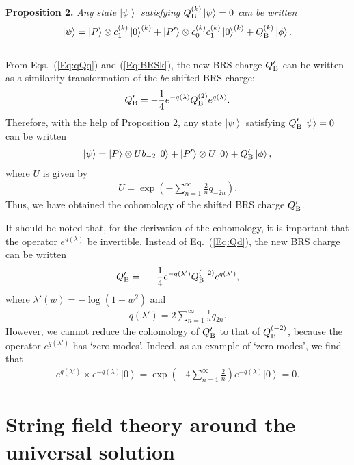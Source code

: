 \documentclass[a4paper,seceq,preprint]{ptptex}
\newcommand{\ket}[1]{\left| #1 \right>}
\newcommand{\Q}{Q_{\rm B}}
\begin{document}
\noindent
{\bf Proposition 2.}
{\it
Any state $\ket{\psi}$ satisfying $\Q^{(k)}\ket{\psi}=0$ 
can be written 
\begin{eqnarray}
 \ket{\psi} = \ket{P}\otimes c_1^{(k)}\ket{0}^{(k)}
              +\ket{P'}\otimes c_0^{(k)}c_1^{(k)}\ket{0}^{(k)}
              +\Q^{(k)}\ket{\phi}.
\end{eqnarray}
}
\\

From Eqs.~(\ref{Eq:qQq}) and (\ref{Eq:BRSk}), the new BRS charge $\Q'$
can be written as a similarity transformation of the $bc$-shifted BRS charge:
\begin{eqnarray}
\label{Eq:Qd}
 \Q' = -\frac{1}{4} e^{-q(\lambda)} \Q^{(2)} e^{q(\lambda)}.
\end{eqnarray}
Therefore, with the help of Proposition 2, any state $\ket{\psi}$ 
satisfying $\Q'\ket{\psi}=0$ can be written 
\begin{eqnarray}
\label{Eq:psi}
 \ket{\psi} = \ket{P}\otimes U b_{-2}\ket{0} 
              +\ket{P'}\otimes U \ket{0}
              +\Q' \ket{\phi},
\end{eqnarray}
where $U$ is given by
\begin{eqnarray}
 U=\exp\left(-\sum_{n=1}^\infty \frac{2}{n}q_{-2n}\right).
\end{eqnarray}
Thus, we have obtained the cohomology of the shifted BRS charge $\Q'$.

It should be noted that, for the derivation of the cohomology,
it is important that the operator $e^{q(\lambda)}$
be invertible.
Instead of Eq.~(\ref{Eq:Qd}), the new BRS charge can be written 
\begin{eqnarray}
 \Q' &=& -\frac{1}{4} e^{-q(\lambda')} \Q^{(-2)} 
 e^{q(\lambda')},
\end{eqnarray}
where $\lambda'(w)=-\log(1-w^2)$ and
\begin{eqnarray}
 q(\lambda') = 2\sum_{n=1}^\infty \frac{1}{n}q_{2n}.
\end{eqnarray}
However, we cannot reduce the cohomology of $\Q'$ to that 
of $\Q^{(-2)}$, because the operator $e^{q(\lambda')}$ has `zero modes'.
Indeed, as an example of `zero modes', we find that
\begin{eqnarray}
 e^{q(\lambda')} \times e^{-q(\lambda)}\ket{0}
=
 \exp\left(-4 \sum_{n=1}^\infty \frac{2}{n} \right)
 e^{-q(\lambda)}\ket{0} =0.
\end{eqnarray}



\section{String field theory around the universal solution}
\end{document}
